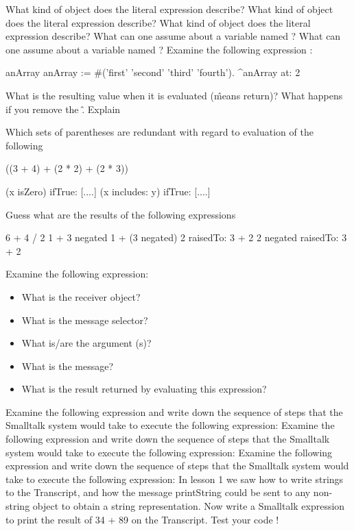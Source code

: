 \exercise What kind of object does the literal expression  describe?
\exercise What kind of object does the literal expression  describe?
\exercise What kind of object does the literal expression  describe?
\exercise What can one assume about a variable named ?
\exercise What can one assume about a variable named ?
\exercise Examine the following expression :

\begin{code}
\ttt{|} anArray \ttt{|}
anArray := #('first' 'second' 'third' 'fourth').
^anArray at: 2
\end{code}

What is the resulting value when it is evaluated (\^ means return)? 
What happens if you remove the \^. Explain

\exercise Which sets of parentheses are redundant with regard to evaluation of the following

\begin{code}
((3 + 4) + (2 * 2) + (2 * 3))

(x isZero) 
   ifTrue: [....]
(x includes: y) 
   ifTrue: [....]      
\end{code}

\exercise Guess what are the results of the following expressions

\begin{code}
6 + 4 / 2 
1 + 3 negated 
1 + (3 negated) 
2 raisedTo: 3 + 2 
2 negated raisedTo: 3 + 2
\end{code}

\exercise Examine the following expression:

\begin{itemize}
\item What is the receiver object? 
\item What is the message selector? 
\item What is/are the argument (s)? 
\item What is the message? 
\item What is the result returned by evaluating this expression?
\end{itemize}

\exercise Examine the following expression and write down the sequence of steps that the Smalltalk system would take to execute the following expression:
\exercise Examine the following expression and write down the sequence of steps that the Smalltalk system would take to execute the following expression:
\exercise Examine the following expression and write down the sequence of steps that the Smalltalk system would take to execute the following expression:
\exercise In lesson 1 we saw how to write strings to the Transcript, and how the message printString could be sent to any non-string object to obtain a string representation. Now write a Smalltalk expression to print the result of 34 + 89 on the Transcript. Test your code !

